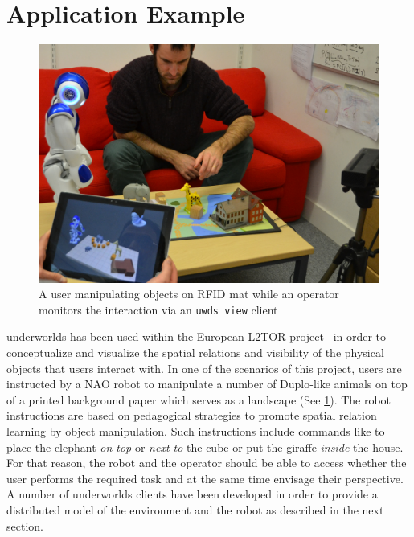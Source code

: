 \documentclass[letterpaper, 10 pt, conference]{ieeeconf}  %
\newcommand{\uwds}{{\sc underworlds}\xspace}
\begin{document}
\section{Application Example}

\begin{figure}
    \centering
    \includegraphics[width=\linewidth]{l2tor-photo2}
    \caption{A user manipulating objects on RFID mat while an operator monitors the interaction via an {\tt uwds view} client}
    \label{fig|l2torexample}
\end{figure}
\uwds has been used within the European L2TOR project~\cite{belpaeme2015l2tor} in order to conceptualize and visualize the spatial relations and visibility of the physical objects that users interact with. In one of the scenarios of this project, users are instructed by a NAO robot to manipulate a number of Duplo-like animals on top of a printed background paper which serves as a landscape (See \ref{fig|l2torexample}). The robot instructions are based on pedagogical strategies to promote spatial relation learning by object manipulation. Such instructions include commands like to place the elephant \textit{on top} or \textit{next to} the cube or put the giraffe \textit{inside} the house.
For that reason, the robot and the operator should be able to access whether the user performs the required task and at the same time envisage their perspective. A number of \uwds clients have been developed in order to provide a distributed model of the environment and the robot as described in the next section.
\end{document}
